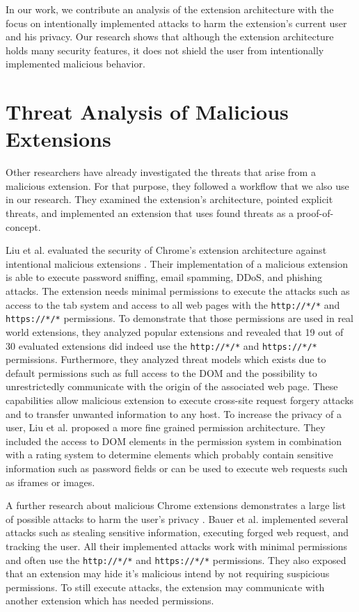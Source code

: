  	In our work, we contribute an analysis of the extension architecture with the focus on intentionally implemented attacks to harm the extension's current user and his privacy. Our research shows that although the extension architecture holds many security features, it does not shield the user from intentionally implemented malicious behavior.
 
 \section{Threat Analysis of Malicious Extensions}
 \label{sec:relatedWorks:threatAnalysis}
 
	Other researchers have already investigated the threats that arise from a malicious extension. For that purpose, they followed a workflow that we also use in our research. They examined the extension's architecture, pointed explicit threats, and implemented an extension that uses found threats as a proof-of-concept.
 
	Liu et al. evaluated the security of Chrome's extension architecture against intentional malicious extensions \cite{Liu12chromeextensions:}. Their implementation of a malicious extension is able to execute password sniffing, email spamming, DDoS, and phishing attacks. The extension needs minimal permissions to execute the attacks such as access to the tab system and access to all web pages with the \texttt{http://*/*} and \texttt{https://*/*} permissions. To demonstrate that those permissions are used in real world extensions, they analyzed popular extensions and revealed that 19 out of 30 evaluated extensions did indeed use the \texttt{http://*/*} and \texttt{https://*/*} permissions. Furthermore, they analyzed threat models which exists due to default permissions such as full access to the DOM and the possibility to unrestrictedly communicate with the origin of the associated web page. These capabilities allow malicious extension to execute cross-site request forgery attacks and to transfer unwanted information to any host. To increase the privacy of a user, Liu et al. proposed a more fine grained permission architecture. They included the access to DOM elements in the permission system in combination with a rating system to determine elements which probably contain sensitive information such as password fields or can be used to execute web requests such as iframes or images. 
	 	
	A further research about malicious Chrome extensions demonstrates a large list of possible attacks to harm the user's privacy \cite{extensions:cns14}. Bauer et al. implemented several attacks such as stealing sensitive information, executing forged web request, and tracking the user. All their implemented attacks work with minimal permissions and often use the \texttt{http://*/*} and \texttt{https://*/*} permissions. They also exposed that an extension may hide it's malicious intend by not requiring suspicious permissions. To still execute attacks, the extension may communicate with another extension which has needed permissions.
	 

